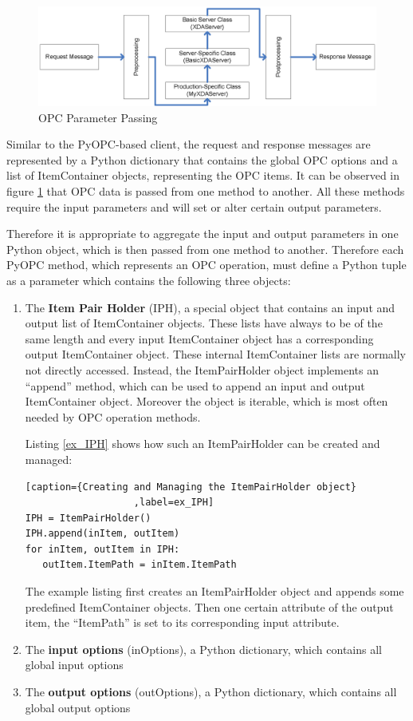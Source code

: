 \begin{figure}[ht]
\centering
\includegraphics[scale=0.7]{graphics/opc_parameters.eps}
\caption{OPC Parameter Passing}
\label {opc_parameters} 
\end{figure}

Similar to the PyOPC-based client, the request and response messages
are represented by a Python dictionary that contains the global OPC
options and a list of ItemContainer objects, representing the OPC
items. It can be observed in figure \ref{opc_parameters} that 
OPC data is passed from one method to another. All these methods
require the input parameters and will set or alter certain output
parameters.

Therefore it is appropriate to aggregate the input and output
parameters in one Python object, which is then passed from one method
to another. Therefore each PyOPC method, which represents an OPC
operation, must define a Python tuple as a parameter which contains
the following three objects:

\begin{enumerate}
\item The {\bf Item Pair Holder} (IPH), a special object that contains
an input and output list of ItemContainer objects. These lists have
always to be of the same length and every input ItemContainer object
has a corresponding output ItemContainer object. These internal
ItemContainer lists are normally not directly accessed. Instead, the
ItemPairHolder object implements an ``append'' method, which can be
used to append an input and output ItemContainer object. Moreover the
object is iterable, which is most often needed by OPC operation
methods.

Listing \ref{ex_IPH} shows how such an ItemPairHolder can be created
and managed:

\lstset{language=C}
\begin{lstlisting}[caption={Creating and Managing the ItemPairHolder object}
                   ,label=ex_IPH] 
IPH = ItemPairHolder()
IPH.append(inItem, outItem)
for inItem, outItem in IPH:
   outItem.ItemPath = inItem.ItemPath
\end{lstlisting}

The example listing first creates an ItemPairHolder object and appends
some predefined ItemContainer objects. Then one certain attribute of
the output item, the ``ItemPath'' is set to its corresponding input
attribute.

\item The {\bf input options} (inOptions), a Python dictionary, which
contains all global input options
\item The {\bf output options} (outOptions), a Python dictionary, which
contains all global output options
\end{enumerate}

